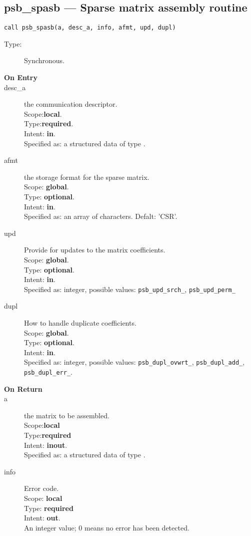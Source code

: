 %
%
\clearpage\subsection*{psb\_spasb --- Sparse matrix assembly routine}

\begin{verbatim}
call psb_spasb(a, desc_a, info, afmt, upd, dupl)
\end{verbatim}

\begin{description}
\item[Type:] Synchronous.
\item[\bf On Entry]
\item[desc\_a] the communication descriptor.\\
Scope:{\bf local}.\\
Type:{\bf required}.\\
Intent: {\bf in}.\\
Specified as: a structured data of type \descdata.
\item[afmt] the storage format for the sparse matrix.\\
Scope: {\bf global}.\\
Type: {\bf optional}.\\
Intent: {\bf in}.\\
Specified as: an array of characters. Defalt:  'CSR'.
\item[upd] Provide for updates to the matrix coefficients.\\
Scope: {\bf global}.\\
Type: {\bf optional}.\\
Intent: {\bf in}.\\
Specified as: integer, possible values: \verb|psb_upd_srch_|, \verb|psb_upd_perm_|
\item[dupl] How to handle duplicate coefficients.\\
Scope: {\bf global}.\\
Type: {\bf optional}.\\
Intent: {\bf in}.\\
Specified as: integer, possible values: \verb|psb_dupl_ovwrt_|,
\verb|psb_dupl_add_|, \verb|psb_dupl_err_|.
\end{description}

\begin{description}
\item[\bf On Return]
\item[a] the matrix to be assembled.\\
Scope:{\bf local}\\
Type:{\bf required}\\
Intent: {\bf inout}.\\
Specified as: a structured data of type \spdata.
\item[info] Error code.\\
Scope: {\bf local} \\
Type: {\bf required} \\
Intent: {\bf out}.\\
An integer value; 0 means no error has been detected. 
\end{description}

